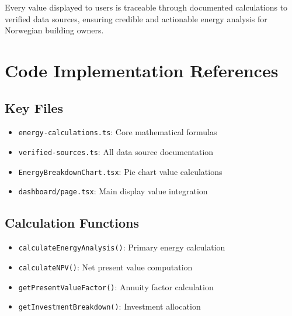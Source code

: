 \documentclass[12pt,a4paper]{article}
\begin{document}
Every value displayed to users is traceable through documented calculations to verified data sources, ensuring credible and actionable energy analysis for Norwegian building owners.

\appendix

\section{Code Implementation References}

\subsection{Key Files}
\begin{itemize}
\item \texttt{energy-calculations.ts}: Core mathematical formulas
\item \texttt{verified-sources.ts}: All data source documentation
\item \texttt{EnergyBreakdownChart.tsx}: Pie chart value calculations
\item \texttt{dashboard/page.tsx}: Main display value integration
\end{itemize}

\subsection{Calculation Functions}
\begin{itemize}
\item \texttt{calculateEnergyAnalysis()}: Primary energy calculation
\item \texttt{calculateNPV()}: Net present value computation
\item \texttt{getPresentValueFactor()}: Annuity factor calculation
\item \texttt{getInvestmentBreakdown()}: Investment allocation
\end{itemize}
\end{document}
